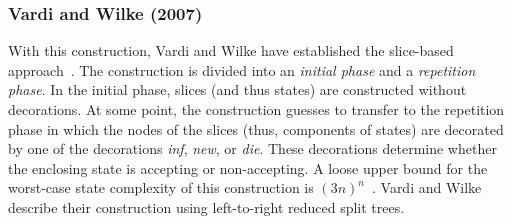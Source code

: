 


\subsubsection{Vardi and Wilke (2007)}
\label{2_vw07}
With this construction, Vardi and Wilke have established the slice-based approach~\cite{2011_tsai}. The construction is divided into an \textit{initial phase} and a \textit{repetition phase}. In the initial phase, slices (and thus states) are constructed without decorations. At some point, the construction guesses to transfer to the repetition phase in which the nodes of the slices (thus, components of states) are decorated by one of the decorations \textit{inf}, \textit{new}, or \textit{die}. These decorations determine whether the enclosing state is accepting or non-accepting. A loose upper bound for the worst-case state complexity of this construction is $(3n)^n$~\cite{vardi2007automata}. Vardi and Wilke describe their construction using left-to-right reduced split trees.




